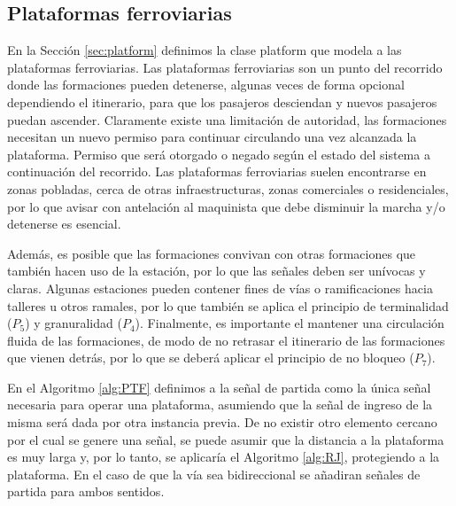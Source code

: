 \subsection{Plataformas ferroviarias}


    En la Sección \ref{sec:platform} definimos la clase platform que modela a las plataformas ferroviarias. Las plataformas ferroviarias son un punto del recorrido donde las formaciones pueden detenerse, algunas veces de forma opcional dependiendo el itinerario, para que los pasajeros desciendan y nuevos pasajeros puedan ascender. Claramente existe una limitación de autoridad, las formaciones necesitan un nuevo permiso para continuar circulando una vez alcanzada la plataforma. Permiso que será otorgado o negado según el estado del sistema a continuación del recorrido. Las plataformas ferroviarias suelen encontrarse en zonas pobladas, cerca de otras infraestructuras, zonas comerciales o residenciales, por lo que avisar con antelación al maquinista que debe disminuir la marcha y/o detenerse es esencial.

    Además, es posible que las formaciones convivan con otras formaciones que también hacen uso de la estación, por lo que las señales deben ser unívocas y claras. Algunas estaciones pueden contener fines de vías o ramificaciones hacia talleres u otros ramales, por lo que también se aplica el principio de terminalidad ($P_5$) y granuralidad ($P_4$). Finalmente, es importante el mantener una circulación fluida de las formaciones, de modo de no retrasar el itinerario de las formaciones que vienen detrás, por lo que se deberá aplicar el principio de no bloqueo ($P_7$).

    En el Algoritmo \ref{alg:PTF} definimos a la señal de partida como la única señal necesaria para operar una plataforma, asumiendo que la señal de ingreso de la misma será dada por otra instancia previa. De no existir otro elemento cercano por el cual se genere una señal, se puede asumir que la distancia a la plataforma es muy larga y, por lo tanto, se aplicaría el Algoritmo \ref{alg:RJ}, protegiendo a la plataforma. En el caso de que la vía sea bidireccional se añadiran señales de partida para ambos sentidos.

